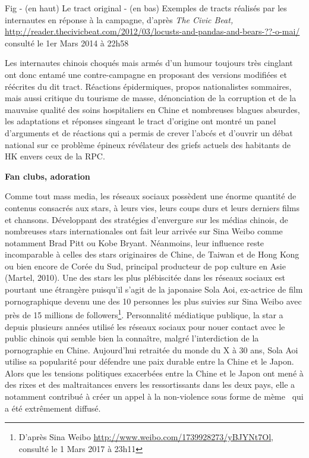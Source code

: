 Fig - (en haut) Le tract original - (en bas) Exemples de tracts
r\'ealis\'es par les internautes en r\'eponse \`a la campagne,
d{\textquoteright}apr\`es \textit{The Civic Beat,
}\url{http://reader.thecivicbeat.com/2012/03/locusts-and-pandas-and-bears-??-o-mai/}
consult\'e le 1er Mars 2014 \`a 22h58


Les internautes chinois choqu\'es mais arm\'es d{\textquoteright}un
humour toujours tr\`es cinglant ont donc entam\'e une contre-campagne
en proposant des versions modifi\'ees et r\'e\'ecrites du dit tract.
R\'eactions \'epidermiques, propos nationalistes sommaires, mais aussi
critique du tourisme de masse, d\'enonciation de la corruption et de la
mauvaise qualit\'e des soins hospitaliers en Chine et nombreuses
blagues absurdes, les adaptations et r\'eponses singeant le tract
d{\textquoteright}origine ont montr\'e un panel
d{\textquoteright}arguments et de r\'eactions qui a permis de crever
l{\textquoteright}abc\'es et d{\textquoteright}ouvrir un d\'ebat
national sur ce probl\`eme \'epineux r\'ev\'elateur des griefs actuels
des habitants de HK envers ceux de la RPC. 

\textbf{Fan clubs, adoration }

Comme tout mass media, les r\'eseaux sociaux poss\`edent une \'enorme
quantit\'e de contenus consacr\'es aux stars, \`a leurs vies, leurs
coups durs et leurs derniers films et chansons. D\'eveloppant des
strat\'egies d{\textquoteright}envergure sur les m\'edias chinois, de
nombreuses stars internationales ont fait leur arriv\'ee sur Sina Weibo
comme notamment Brad Pitt ou Kobe Bryant. N\'eanmoins, leur influence
reste incomparable \`a celles des stars originaires de Chine, de Taiwan
et de Hong Kong ou bien encore de Cor\'ee du Sud, principal producteur
de pop culture en Asie (Martel, 2010). Une des stars les plus
pl\'ebiscit\'ee dans les r\'eseaux sociaux est pourtant une
\'etrang\`ere puisqu{\textquoteright}il s{\textquoteright}agit de la
japonaise Sola Aoi, ex-actrice de film pornographique devenu une des 10
personnes les plus suivies sur Sina Weibo avec pr\`es de 15 millions de
followers\footnote{ D{\textquoteright}apr\`es Sina Weibo
\url{http://www.weibo.com/1739928273/yBJYNt7Ol,} consult\'e le 1 Mars
2017 \`a 23h11}. Personnalit\'e m\'ediatique publique, la star a depuis
plusieurs ann\'ees utilis\'e les r\'eseaux sociaux pour nouer contact
avec le public chinois qui semble bien la conna\^itre, malgr\'e
l{\textquoteright}interdiction de la pornographie en Chine.
Aujourd{\textquoteright}hui retrait\'ee du monde du X \`a 30 ans, Sola
Aoi utilise sa popularit\'e pour d\'efendre une paix durable entre la
Chine et le Japon. Alors que les tensions politiques exacerb\'ees entre
la Chine et le Japon ont men\'e \`a des rixes et des maltraitances
envers les ressortissants dans les deux pays, elle a notamment
contribu\'e \`a cr\'eer un appel \`a la non-violence sous forme de
m\`eme \ qui a \'et\'e extr\^emement diffus\'e. 

